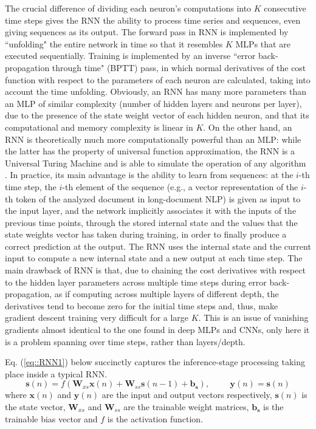\documentclass[preprint,review,12pt]{elsarticle}
\begin{document}
The crucial difference of dividing each neuron's computations into $K$ consecutive time steps gives the RNN the ability to process time series and sequences, even giving sequences as its output. The forward pass in RNN is implemented by ``unfolding" the entire network in time so that it resembles $K$ MLPs that are executed sequentially. Training is implemented by an inverse ``error back-propagation through time" (BPTT) pass, in which normal derivatives of the cost function with respect to the parameters of each neuron are calculated, taking into account the time unfolding. Obviously, an RNN has many more parameters than an MLP of similar complexity (number of hidden layers and neurons per layer), due to the presence of the state weight vector of each hidden neuron, and that its computational and memory complexity is linear in $K$. On the other hand, an RNN is theoretically much more computationally powerful than an MLP: while the latter has the property of universal function approximation, the RNN is a Universal Turing Machine and is able to simulate the operation of any algorithm \cite{siegelman}. In practice, its main advantage is the ability to learn from sequences: at the $i$-th time step, the $i$-th element of the sequence (e.g., a vector representation of the $i$-th token of the analyzed document in long-document NLP) is given as input to the input layer, and the network implicitly associates it with the inputs of the previous time points, through the stored internal state and the values that the state weights vector has taken during training, in order to finally produce a correct prediction at the output. The RNN uses the internal state and the current input to compute a new internal state and a new output at each time step. The main drawback of RNN is that, due to chaining the cost derivatives with respect to the hidden layer parameters across multiple time steps during error back-propagation, as if computing across multiple layers of different depth, the derivatives tend to become zero for the initial time steps and, thus, make gradient descent training very difficult for a large $K$. This is an issue of vanishing gradients almost identical to the one found in deep MLPs and CNNs, only here it is a problem spanning over time steps, rather than layers/depth.

Eq. (\ref{eq::RNN1}) below succinctly captures the inference-stage processing taking place inside a typical RNN.
\begin{equation}
    \mathbf{s}(n) = f(\mathbf{W}_{xs} \mathbf{x}(n) + \mathbf{W}_{ss} \mathbf{s}(n-1) + \mathbf{b_s}), \hspace{1cm} \mathbf{y}(n) = \mathbf{s}(n)
\label{eq::RNN1}
\end{equation}
\noindent where $\mathbf{x}(n)$ and $\mathbf{y}(n)$ are the input and output vectors respectively, $\mathbf{s}(n)$ is the state vector, $\mathbf{W}_{xs}$ and $\mathbf{W}_{ss}$ are the trainable weight matrices, $\mathbf{b_s}$ is the trainable bias vector and $f$ is the activation function.
\end{document}
